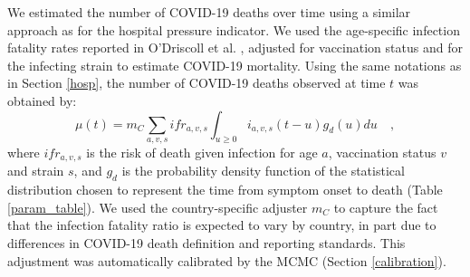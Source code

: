 We estimated the number of COVID-19 deaths over time using a similar approach 
as for the hospital pressure indicator. We used the age-specific infection fatality rates reported in
O'Driscoll et al. \cite{odriscoll2021}, adjusted for vaccination status and for the infecting strain
to estimate COVID-19 mortality. Using the same notations as in Section \ref{hosp}, the number of COVID-19
deaths observed at time $t$ was obtained by:
\begin{equation}
\mu(t) = m_C \sum_{a,v,s} ifr_{a,v,s} \int_{u \geq 0}  i_{a,v,s}(t-u)g_{d}(u) du   \quad,
\end{equation}
where $ifr_{a,v,s}$ is the risk of death given infection for age $a$, vaccination status $v$ and strain $s$, 
and $g_d$ is the probability density function of the statistical distribution chosen to represent the 
time from symptom onset to death (Table \ref{param_table}). We used the country-specific adjuster $m_C$ to 
capture the fact that the infection fatality ratio is expected to vary by country, in part due to 
differences in COVID-19 death definition and reporting standards. This adjustment was automatically calibrated 
by the MCMC (Section \ref{calibration}).